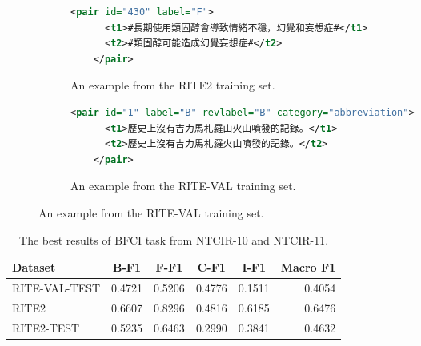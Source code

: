 \documentclass[12pt]{article}
\begin{document}
\begin{CJK*}{UTF8}{bkai}
\begin{spacing}{1.77}

\begin{figure}[ht!]
  \centering
  \caption{The examples of RITE2 and RITE-VAL.}
  \begin{subfigure}{1\linewidth}
    \caption{An example from the RITE2 training set.}
  \begin{minipage}{\linewidth}
  \begin{lstlisting}[language=XML]
    <pair id="430" label="F">
      <t1>#長期使用類固醇會導致情緒不穩，幻覺和妄想症#</t1>
      <t2>#類固醇可能造成幻覺妄想症#</t2>
    </pair>
  \end{lstlisting}
  \end{minipage}
  \end{subfigure}

  \begin{subfigure}{1\linewidth}
    \caption{An example from the RITE-VAL training set.}
    \begin{minipage}{\linewidth}
    \begin{lstlisting}[language=XML]
    <pair id="1" label="B" revlabel="B" category="abbreviation">
      <t1>歷史上沒有吉力馬札羅山火山噴發的記錄。</t1>
      <t2>歷史上沒有吉力馬札羅火山噴發的記錄。</t2>
    </pair>
    \end{lstlisting}
    \end{minipage}
  \end{subfigure}
  \label{fig:rite_example}
\end{figure}


\begin{table}[H]
  \centering
  \setlength{\extrarowheight}{-3pt}
  \begin{tabular}{|l|r|r|r|r|r|}
  \hline
   Dataset & \multicolumn{1}{c|}{B-F1} & \multicolumn{1}{c|}{F-F1} & \multicolumn{1}{c|}{C-F1} & \multicolumn{1}{c|}{I-F1} & \multicolumn{1}{c|}{Macro F1} \\ \hline
  RITE-VAL-TEST & 0.4721 & 0.5206 & 0.4776 & 0.1511 & 0.4054 \\ \hline
  RITE2 & 0.6607 & 0.8296 & 0.4816 & 0.6185 & 0.6476 \\ \hline
  RITE2-TEST & 0.5235 & 0.6463 & 0.2990 & 0.3841 & 0.4632 \\ \hline
  \end{tabular}
  \caption{The best results of BFCI task from NTCIR-10 and NTCIR-11.}
  \label{result:bfci_ntcir}
\end{table}


\end{spacing}
\end{CJK*}
\end{document}
